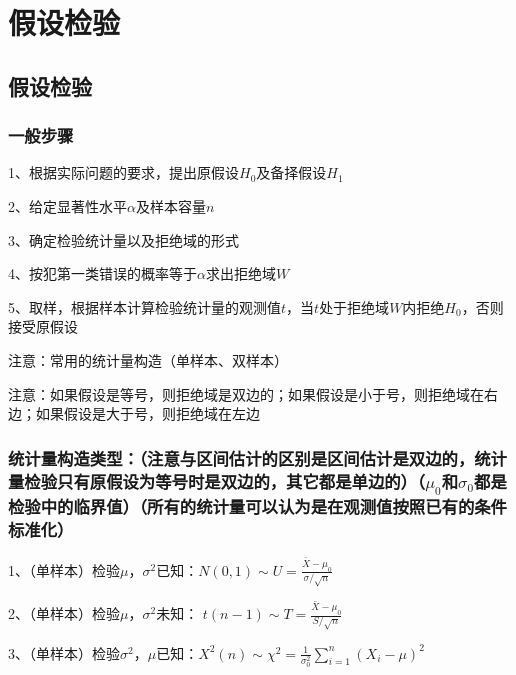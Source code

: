 \chapter{假设检验}

\section{假设检验}



\subsection{一般步骤}

1、根据实际问题的要求，提出原假设$H_0$及备择假设$H_1$

2、给定显著性水平$\alpha$及样本容量$n$

3、确定检验统计量以及拒绝域的形式

4、按犯第一类错误的概率等于$\alpha$求出拒绝域$W$

5、取样，根据样本计算检验统计量的观测值$t$，当$t$处于拒绝域$W$内拒绝$H_0$，否则接受原假设

注意：常用的统计量构造（单样本、双样本）

注意：如果假设是等号，则拒绝域是双边的；如果假设是小于号，则拒绝域在右边；如果假设是大于号，则拒绝域在左边



\subsection{统计量构造类型：（注意与区间估计的区别是区间估计是双边的，统计量检验只有原假设为等号时是双边的，其它都是单边的）（$\mu_0$和$\sigma_0$都是检验中的临界值）（所有的统计量可以认为是在观测值按照已有的条件标准化）}

1、（单样本）检验$\mu$，$\sigma^{2}$已知：$N(0,1) \sim U=\frac{\bar{X}-\mu_{0}}{\sigma / \sqrt{n}}$

2、（单样本）检验$\mu$，$\sigma^{2}$未知： $t(n-1) \sim T=\frac{\bar{X}-\mu_{0}}{S / \sqrt{n}}$

3、（单样本）检验$\sigma^{2}$，$\mu$已知：$X^2(n) \sim \chi^{2}=\frac{1}{\sigma_{0}^{2}} \sum_{i=1}^{n}\left(X_{i}-\mu\right)^{2}$

